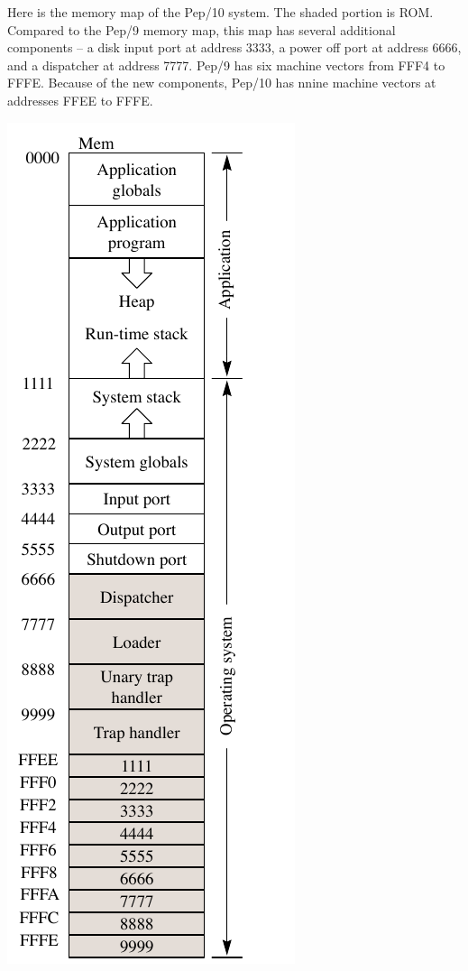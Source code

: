 \documentclass[10pt,fleqn]{book}
\begin{document}
\noindent Here is the memory map of the Pep/10 system.
The shaded portion is ROM.
Compared to the Pep/9 memory map, this map has several additional components -- a disk input port at address 3333, a power off port at address 6666, and a dispatcher at address 7777.
Pep/9 has six machine vectors from FFF4 to FFFE.
Because of the new components, Pep/10 has nnine machine vectors at addresses FFEE to FFFE.\\
\begin{center}
\includegraphics{pep10-memory-map}
\end{center}
\end{document}
